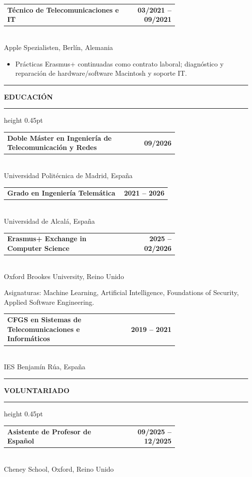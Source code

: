 \documentclass[9pt,a4paper]{article}
\makeatletter
\newcommand{\cvsection}[1]{%
  \vspace{3pt}
  {\color{accent}\rule{7pt}{7pt}}\hspace{4pt}
  {\bfseries\color{navy}\scriptsize #1}
  \vspace{1pt}
  {\color{linegray}\hrule height 0.45pt}
  \vspace{2pt}
}
\newcommand{\entry}[3]{%
  \begin{tabular*}{\linewidth}{@{}p{0.70\linewidth}@{\extracolsep{\fill}}r@{}}
  \textbf{\color{navy}#1} & {\scriptsize\bfseries\color{accent}#2}
  \end{tabular*}\\[-2pt]
  {\scriptsize\color{muted}#3}
  \vspace{1.5pt}
}
\makeatother
\begin{document}
\begin{minipage}[t]{0.66\textwidth}
\entry{Técnico de Telecomunicaciones e IT}{03/2021 -- 09/2021}{Apple Spezialisten, Berlín, Alemania}
\begin{itemize}
\item Prácticas Erasmus+ continuadas como contrato laboral; diagnóstico y reparación de hardware/software Macintosh y soporte IT.
\end{itemize}

\cvsection{EDUCACIÓN}

\entry{Doble Máster en Ingeniería de Telecomunicación y Redes}{09/2026}{Universidad Politécnica de Madrid, España}

\entry{Grado en Ingeniería Telemática}{2021 -- 2026}{Universidad de Alcalá, España}

\entry{Erasmus+ Exchange in Computer Science}{2025 -- 02/2026}{Oxford Brookes University, Reino Unido}
{\scriptsize\color{muted}Asignaturas: Machine Learning, Artificial Intelligence, Foundations of Security, Applied Software Engineering.}

\entry{CFGS en Sistemas de Telecomunicaciones e Informáticos}{2019 -- 2021}{IES Benjamín Rúa, España}

\cvsection{VOLUNTARIADO}

\entry{Asistente de Profesor de Español}{09/2025 -- 12/2025}{Cheney School, Oxford, Reino Unido}

\end{minipage}
\end{document}

